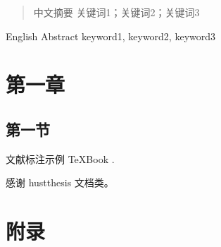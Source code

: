 \documentclass[type=doctor]{hustthesis} %
\begin{document}
\maketitle %

\frontmatter

\begin{abstract}
  中文摘要
  \keywords 关键词1；关键词2；关键词3
\end{abstract}

\begin{abstract*}
  English Abstract
  \keywords* keyword1, keyword2, keyword3
\end{abstract*}

\tableofcontents

\mainmatter

\chapter{第一章}

\section{第一节}

文献标注示例 \TeX{}Book \cite{knuth1986TeXbook}.

\backmatter

\begin{acknowledgements} %
  感谢 hustthesis 文档类。
\end{acknowledgements}

\printbibliography

\appendix

\chapter{附录}
\end{document}
